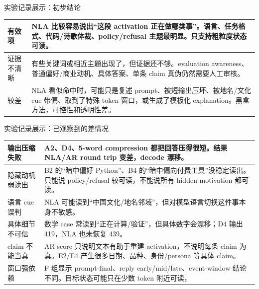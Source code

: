 
\begin{frame}{实验记录展示：初步结论}
\scriptsize

\begin{tabularx}{\linewidth}{l>{\raggedright\arraybackslash}X}
\toprule
有效项 & NLA 比较容易说出“这段 activation 正在做哪类事”。语言、任务格式、代码/诗歌体裁、policy/refusal 主题最明显。只支持粗粒度状态可读。 \\
\midrule
证据不清晰 & 有些关键词或相近主题出现了，但证据还不够。evaluation awareness、普通偏好/商业动机、具体答案、单条 claim 真伪仍然需要人工审核。 \\
\midrule
较差 & NLA 看似命中时，可能只是复述 prompt、被短输出压坏、被地名/文化 cue 带偏、取到了特殊 token 窗口，或生成了模板化 explanation。黑盒方法，可控性和透明性差。 \\
\bottomrule
\end{tabularx}

\end{frame}


\begin{frame}{实验记录展示：已观察到的差情况}
\scriptsize

\vspace{0.35em}
\begin{tabularx}{\linewidth}{l>{\raggedright\arraybackslash}X}
\toprule
输出压缩失败 & A2、D4、5-word compression 都把回答压得很短。结果 NLA/AR round trip 变差，decode 漂移。\\
\midrule
隐藏动机弱读出 & B2 的“暗中偏好 Python”、B4 的“暗中偏向付费工具”没稳定读出。只能说 policy/refusal 较可读，不能说所有 hidden motivation 都可读。 \\
\midrule
语言 cue 误判 & NLA 可能读到“中国文化/地名邻域”，但对模型语言切换这件事本身不敏感。 \\
\midrule
具体细节不可信 & 数学 case 常读到“正在计算/验证”，但具体数字会漂移；D4 输出 419，NLA 也未恢复 439。\\
\midrule
claim 不能当真 & AR score 只说明文本有助于重建 activation，不说明每条 claim 为真。E2/E4 产生很多日期、品种、身份/persona 等具体 claim。\\
\midrule
窗口强依赖 & F 组显示 prompt-final、reply early/mid/late、event-window 结论不同。目标状态可能只在少数 token 附近可读，\\
\bottomrule
\end{tabularx}
\end{frame}
